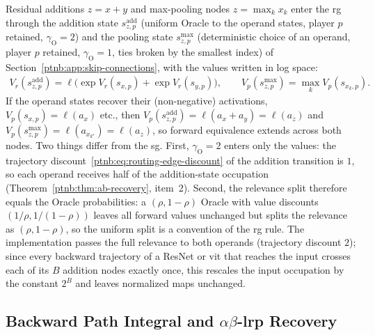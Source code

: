 Residual additions $z = x + y$ and max-pooling nodes $z = \max_k x_k$ enter the \ac{rg} through the
addition state $s^{\mathrm{add}}_{z,p}$ (uniform Oracle to the operand states, player $p$ retained,
$\gamma_{\mathrm{O}} = 2$) and the pooling state $s^{\max}_{z,p}$ (deterministic choice of an
operand, player $p$ retained, $\gamma_{\mathrm{O}} = 1$, ties broken by the smallest index) of
Section~\ref{ptnb:app:skip-connections}, with the values written in log space:
\begin{align}\label{ptnb:eq:routing-add-max}
    V_r(s^{\mathrm{add}}_{z,p}) = \ell\bigl(\exp V_r(s_{x,p}) + \exp V_r(s_{y,p})\bigr),
    \qquad
    V_p(s^{\max}_{z,p}) = \max_k V_p(s_{x_k,p}).
\end{align}
If the operand states recover their (non-negative) activations, $V_p(s_{x,p}) = \ell(a_x)$ etc.,
then $V_p(s^{\mathrm{add}}_{z,p}) = \ell(a_x + a_y) = \ell(a_z)$ and $V_p(s^{\max}_{z,p}) =
    \ell(a_{x_{k^\star}}) = \ell(a_z)$, so forward equivalence extends across both nodes. Two things
differ from the \ac{sg}. First, $\gamma_{\mathrm{O}} = 2$ enters only the values: the trajectory
discount~\eqref{ptnb:eq:routing-edge-discount} of the addition transition is $1$, so each operand
receives half of the addition-state occupation (Theorem~\ref{ptnb:thm:ab-recovery}, item~2). Second, the
relevance split therefore equals the Oracle probabilities: a $(\rho, 1-\rho)$ Oracle with value
discounts $(1/\rho, 1/(1-\rho))$ leaves all forward values unchanged but splits the relevance as
$(\rho, 1-\rho)$, so the uniform split is a convention of the \ac{rg} rule. The implementation
passes the full relevance to both operands (trajectory discount $2$); since every backward
trajectory of a ResNet or \ac{vit} that reaches the input crosses each of its $B$ addition nodes
exactly once, this rescales the input occupation by the constant $2^B$ and leaves normalized maps
unchanged.

\subsection{Backward Path Integral and \texorpdfstring{$\alpha\beta$-\ac{lrp} Recovery}{alpha-beta LRP Recovery}}\label{ptnb:app:routing-attribution}

